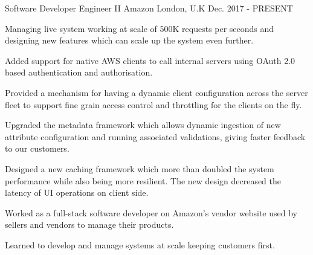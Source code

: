 

\begin{cventries}

  \cventry
    {Software Developer Engineer II} %
    {Amazon} %
    {London, U.K} %
    {Dec. 2017 - PRESENT} %
    {
      \begin{cvitems} %
        \item {Managing live system working at scale of 500K requests per seconds and designing new features which can scale up the system even further.}
        \item {Added support for native AWS clients to call internal servers using OAuth 2.0 based authentication and authorisation.}
        \item {Provided a mechanism for having a dynamic client configuration across the server fleet to support fine grain access control and throttling for the clients on the fly.}
        \item {Upgraded the metadata framework which allows dynamic ingestion of new attribute configuration and running associated validations, giving faster feedback to our customers.}
        \item {Designed a new caching framework which more than doubled the system performance while also being more resilient. The new design decreased the latency of UI operations on client side.}
        \item {Worked as a full-stack software developer on Amazon's vendor website used by sellers and vendors to manage their products.}
        \item {Learned to develop and manage systems at scale keeping customers first.}
      \end{cvitems}
    }


\end{cventries}
